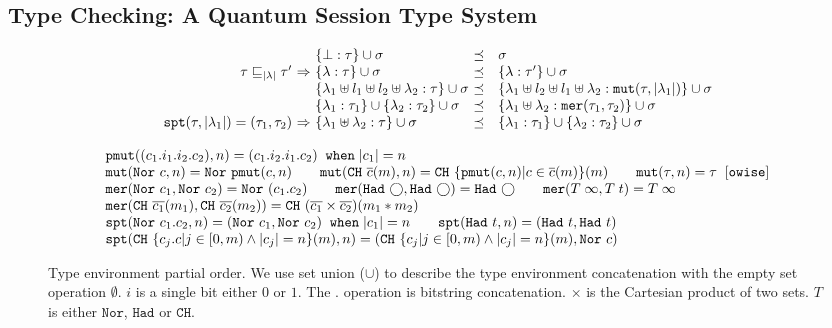 \subsection{Type Checking: A Quantum Session Type System}\label{sec:typesystem}

\begin{figure}
{\small
\begin{center}
 \[
  \begin{array}{r@{~}c@{~}l@{~}cl}
  &&\{\bot:\tau\} \cup \sigma &\preceq& \sigma\\
  \tau\sqsubseteq_{\slen{\lambda}}\tau' &\Rightarrow& \{\lambda:\tau\} \cup \sigma &\preceq& \{\lambda:\tau'\} \cup \sigma\\
  &&\{\lambda_1\uplus l_1 \uplus l_2 \uplus \lambda_2 :\tau\} \cup \sigma &\preceq& \{\lambda_1\uplus l_2 \uplus l_1 \uplus \lambda_2 : \texttt{mut}(\tau,\slen{\lambda_1})\} \cup \sigma\\
  &&\{\lambda_1 :\tau_1\} \cup \{\lambda_2 :\tau_2\} \cup \sigma &\preceq& \{\lambda_1 \uplus \lambda_2 :\texttt{mer}(\tau_1,\tau_2)\} \cup \sigma \\
  \texttt{spt}(\tau,\slen{\lambda_1})=(\tau_1,\tau_2)&\Rightarrow&\{\lambda_1 \uplus \lambda_2 :\tau\} \cup \sigma &\preceq& \{\lambda_1 :\tau_1\} \cup \{\lambda_2 :\tau_2\} \cup \sigma
    \end{array}
  \]
\end{center}
{\footnotesize
\[
\begin{array}{l}
\texttt{pmut}((c_1.i_1.i_2.c_2),n)=(c_1.i_2.i_1.c_2) \;\;\texttt{when}\;|c_1|=n
\\
\texttt{mut}(\texttt{Nor}~{c},n)=\texttt{Nor}~{\texttt{pmut}(c,n)}
\qquad
\texttt{mut}(\texttt{CH}~{\overline{c}(m)},n)=\texttt{CH}~{\{\texttt{pmut}(c,n)|c\in\overline{c}(m)\}(m)}
\qquad
\texttt{mut}(\tau,n)=\tau\;\;[\texttt{owise}]
\\
\texttt{mer}(\texttt{Nor}~{c_1},\texttt{Nor}~{c_2})=\texttt{Nor}~{(c_1.c_2)}
\qquad
\texttt{mer}(\texttt{Had}~{\bigcirc},\texttt{Had}~{\bigcirc})=\texttt{Had}~{\bigcirc}
\qquad
\texttt{mer}(T\;\infty,T\;t)=T\;\infty
\\
\texttt{mer}(\texttt{CH}~{\overline{c_1}(m_1)},\texttt{CH}~{\overline{c_2}(m_2)})=\texttt{CH}~{(\overline{c_1}\times \overline{c_2})(m_1*m_2)}
\\
\texttt{spt}(\texttt{Nor}~{c_1.c_2},n)=(\texttt{Nor}~{c_1},\texttt{Nor}~{c_2}) \;\;\texttt{when}\;|c_1|=n
\qquad
\texttt{spt}(\texttt{Had}~{t},n)=(\texttt{Had}~{t},\texttt{Had}~{t})
\\
\texttt{spt}(\texttt{CH}~{\{c_j.c|j\in [0,m)\wedge |c_j|=n\}(m)},n)=(\texttt{CH}~{\{c_j|j\in [0,m)\wedge |c_j|=n\}(m)},\texttt{Nor}~{c})
\end{array}
\]
}
\caption{Type environment partial order. We use set union ($\cup$) to describe the type environment concatenation with the empty set operation $\emptyset$. $i$ is a single bit either $0$ or $1$. The $.$ operation is bitstring concatenation. $\times$ is the Cartesian product of two sets.
$T$ is either $\texttt{Nor}$, $\texttt{Had}$ or $\texttt{CH}$. }
  \label{fig:env-equiv}
}
\end{figure}

